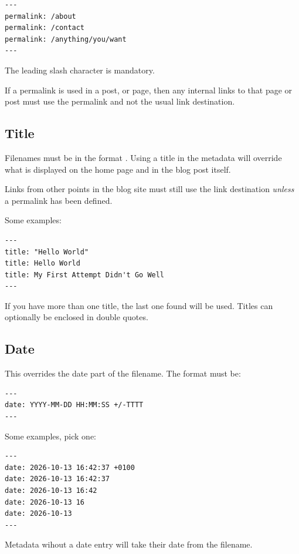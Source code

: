 \begin{lstlisting}[style=myText]
---
permalink: /about
permalink: /contact
permalink: /anything/you/want
---
\end{lstlisting}

The leading slash character is mandatory.

If a permalink is used in a post, or page, then any internal links to that page or post must use the permalink and not the usual  link destination.


\subsection{Title}

Filenames must be in the format . Using a title in the metadata will override what is displayed on the home page and in the blog post itself.

Links from other points in the blog site must still use the  link destination \emph{unless} a permalink has been defined.

Some examples:

\begin{lstlisting}[style=myText]
---
title: "Hello World"
title: Hello World
title: My First Attempt Didn't Go Well
---
\end{lstlisting}

If you have more than one title, the last one found will be used. Titles can optionally be enclosed in double quotes.

\subsection{Date}

This overrides the date part of the filename. The format must be:

\begin{lstlisting}[style=myText]
---
date: YYYY-MM-DD HH:MM:SS +/-TTTT
---
\end{lstlisting}

Some examples, pick one:

\begin{lstlisting}[style=myText]
---
date: 2026-10-13 16:42:37 +0100
date: 2026-10-13 16:42:37
date: 2026-10-13 16:42
date: 2026-10-13 16
date: 2026-10-13
---
\end{lstlisting}

Metadata wihout a date entry will take their date from the filename.

